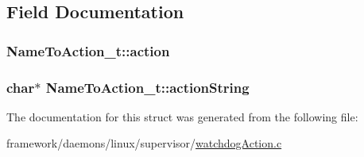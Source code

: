 \subsection{Field Documentation}
\subsubsection[{\texorpdfstring{action}{action}}]{ Name\+To\+Action\+\_\+t\+::action}\hypertarget{struct_name_to_action__t_a9b80b568766add277afdc4a365d2fa23}{}\label{struct_name_to_action__t_a9b80b568766add277afdc4a365d2fa23}
\subsubsection[{\texorpdfstring{action\+String}{actionString}}]{\setlength{\rightskip}{0pt plus 5cm}char$\ast$ Name\+To\+Action\+\_\+t\+::action\+String}\hypertarget{struct_name_to_action__t_a77c03f3c2b942477e543ddaa54c55328}{}\label{struct_name_to_action__t_a77c03f3c2b942477e543ddaa54c55328}


The documentation for this struct was generated from the following file\+:\begin{DoxyCompactItemize}
\item 
framework/daemons/linux/supervisor/\hyperlink{watchdog_action_8c}{watchdog\+Action.\+c}\end{DoxyCompactItemize}
